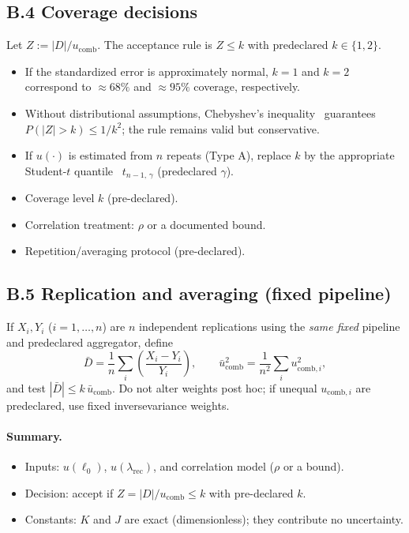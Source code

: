 \documentclass[11pt]{article}
\theoremstyle{plain}
\theoremstyle{definition}
\theoremstyle{remark}
\begin{document}
\subsection*{B.4 Coverage decisions}
Let \(Z:=|D|/u_{\mathrm{comb}}\). The acceptance rule is \(Z\le k\) with pre\-declared \(k\in\{1,2\}\).
\begin{itemize}
  \item If the standard\-ized error is approximately normal, \(k=1\) and \(k=2\) correspond to \(\approx68\%\) and \(\approx95\%\) coverage, respectively.
  \item Without distribu\-tional assumptions, Chebyshev’s inequality~\cite{Billingsley1995} guarantees \(P(|Z|>k)\le 1/k^2\); the rule remains valid but conservative.
  \item If \(u(\cdot)\) is estimated from \(n\) repeats (Type A), replace \(k\) by the appropriate Student-\(t\) quantile~\cite{Student1908} \(t_{n-1,\,\gamma}\) (pre\-declared \(\gamma\)).
\end{itemize}

\begin{itemize}
  \item Coverage level $k$ (pre-declared).
  \item Correlation treatment: $\rho$ or a documented bound.
  \item Repetition/averaging protocol (pre-declared).
\end{itemize}


\subsection*{B.5 Replication and averaging (fixed pipeline)}
If \(X_i,Y_i\) (\(i=1,\dots,n\)) are \(n\) independent replications using the \emph{same fixed} pipeline and pre\-declared aggregator, define
\[
\bar{D}=\frac{1}{n}\sum_i \left(\frac{X_i-Y_i}{Y_i}\right),\qquad
\bar{u}_{\mathrm{comb}}^2=\frac{1}{n^2}\sum_i u_{\mathrm{comb},i}^2,
\]
and test \(|\bar{D}| \le k\,\bar{u}_{\mathrm{comb}}\). Do not alter weights post hoc; if unequal \(u_{\mathrm{comb},i}\) are pre\-declared, use fixed inverse\-variance weights.

\paragraph{Summary.}
\begin{itemize}
  \item Inputs: $u(\ell_0)$, $u(\lambda_{\mathrm{rec}})$, and correlation model ($\rho$ or a bound).
  \item Decision: accept if $Z=|D|/u_{\mathrm{comb}} \le k$ with pre-declared $k$.
  \item Constants: $K$ and $J$ are exact (dimensionless); they contribute no uncertainty.
\end{itemize}
\end{document}
